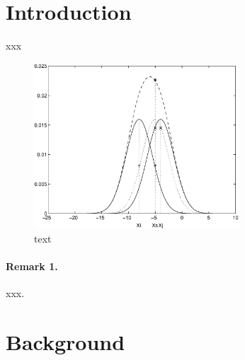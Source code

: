 \documentclass[runningheads,a4paper]{llncs}
\newcommand{\keywords}[1]{\par\addvspace\baselineskip
\noindent\keywordname\enspace\ignorespaces#1}
\begin{document}

\begin{abstract}
[[PENDING: The abstract should summarize the contents of the paper and
should contain at least 70 and at most 150 words. It should be written using the
\emph{abstract} environment]].
\keywords{[[PENDING]]}
\end{abstract}



\section{Introduction}

xxx

\begin{figure}
\centering
\includegraphics[height=6.2cm]{eijkel2}
\caption{text}
\label{fig:example}
\end{figure}

\paragraph{Remark 1.}

xxx.


\section{Background}
\end{document}
